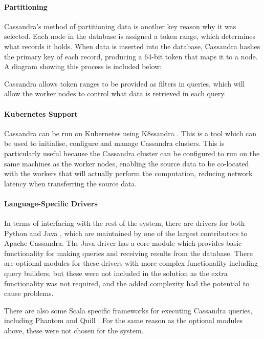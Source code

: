 \paragraph{Partitioning} Cassandra's method of partitioning data is another key reason why it was selected. Each node in the database is assigned a token range, which determines what records it holds. When data is inserted into the database, Cassandra hashes the primary key of each record, producing a 64-bit token that maps it to a node. A diagram showing this process is included below:

Cassandra allows token ranges to be provided as filters in queries, which will allow the worker nodes to control what data is retrieved in each query.

\paragraph{Kubernetes Support} Cassandra can be run on Kubernetes using K8ssandra \cite{k8ssandra}. This is a tool which can be used to initialise, configure and manage Cassandra clusters. This is particularly useful because the Cassandra cluster can be configured to run on the same machines as the worker nodes, enabling the source data to be co-located with the workers that will actually perform the computation, reducing network latency when transferring the source data.

\paragraph{Language-Specific Drivers} In terms of interfacing with the rest of the system, there are drivers for both Python and Java , which are maintained by one of the largest contributors to Apache Cassandra. The Java driver has a core module which provides basic functionality for making queries and receiving results from the database. There are optional modules for these drivers with more complex functionality including query builders, but these were not included in the solution as the extra functionality was not required, and the added complexity had the potential to cause problems. 

There are also some Scala specific frameworks for executing Cassandra queries, including Phantom and Quill . For the same reason as the optional modules above, these were not chosen for the system.

